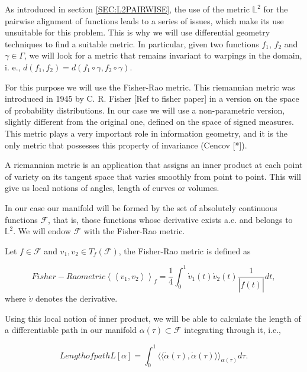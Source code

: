 As introduced in section \ref{SEC:L2PAIRWISE}, the use of the metric $\mathbb{L}^2$
for the pairwise alignment of functions leads to a series of issues, which make
its use unsuitable for this problem. This is why we will use differential
geometry techniques to find a suitable metric. In particular, given two
functions $f_1$, $f_2$ and $\gamma \in \Gamma$, we will look for a metric that
remains invariant to warpings in the domain, i. e.,
$d(f_1, f_2) = d(f_1 \circ \gamma, f_2 \circ \gamma)$.

For this purpose we will use the Fisher-Rao metric. This riemannian metric was
introduced in 1945 by C. R. Fisher [Ref to fisher paper] in a version on the
space of probability distributions. In our case we will use a non-parametric
version, slightly different from the original one, defined on the space of
signed measures. This metric plays a very important role in information
geometry, and it is the only metric that possesses this property of
invariance (Cencov [*]).

A riemannian metric is an application that assigns an inner product at each
point of variety on its tangent space that varies smoothly from point to point.
This will give us local notions of angles, length of curves or volumes.

In our case our manifold will be formed by the set of absolutely continuous
functions $\mathcal{F}$, that is, those functions whose derivative exists a.e.
and belongs to $\mathbb{L}^2$. We will endow $\mathcal{F}$ with the
Fisher-Rao metric.

Let $f \in \mathcal{F}$  and $v_{1}, v_{2} \in T_{f}(\mathcal{F})$,
the Fisher-Rao metric is defined as

\begin{equation}[]{Fisher-Rao metric}
\left\langle\left\langle v_{1}, v_{2}\right\rangle\right\rangle_{f}=
\frac{1}{4} \int_{0}^{1} \dot{v}_{1}(t) \dot{v}_{2}(t) \frac{1}{|\dot{f}(t)|}dt,
\end{equation}
where $\dot v$ denotes the derivative.

Using this local notion of inner product, we will be able to calculate the
length of a differentiable path in our manifold
$\alpha(\tau) \subset \mathcal{F}$ integrating through it, i.e.,

\begin{equation}[]{Length of path}
L[\alpha] = \int_0^1 \langle \langle \dot \alpha(\tau), \dot \alpha(\tau)
\rangle \rangle_{\alpha(\tau)} d\tau.
\end{equation}

